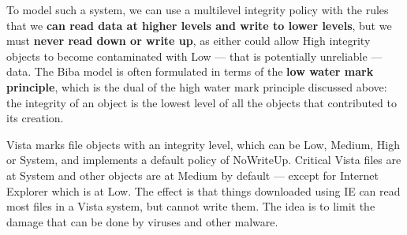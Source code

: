 				To model such a system, we can use a multilevel integrity policy with the
				rules that we {\bf can read data at higher levels and write to lower levels}, 
				but we must {\bf never read down or write up}, as either could allow High 
				integrity objects to become contaminated with Low — that is potentially 
				unreliable — data. 
				The Biba model is often formulated in terms of the {\bf low water mark principle},
				which is the dual of the high water mark principle discussed above: 
				the integrity of an object is the lowest level of all the objects that contributed
				to its creation.

				Vista marks file objects with an integrity level, which can be Low, Medium,
				High or System, and implements a default policy of NoWriteUp. Critical Vista
				files are at System and other objects are at Medium by default — except for
				Internet Explorer which is at Low. The effect is that things downloaded using
				IE can read most files in a Vista system, but cannot write them. The idea is to
				limit the damage that can be done by viruses and other malware. 














